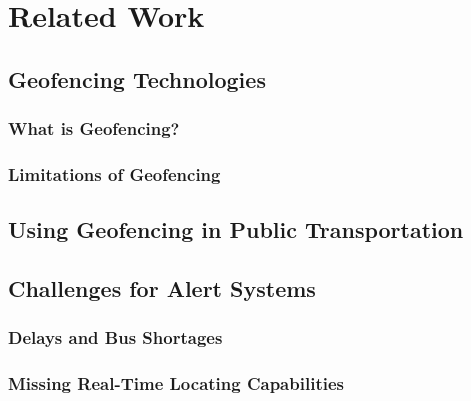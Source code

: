 \chapter{Related Work}
\label{cha:RelatedWork}

\section{Geofencing Technologies}
\subsection{What is Geofencing?}
\subsection{Limitations of Geofencing}

\section{Using Geofencing in Public Transportation}

\section{Challenges for Alert Systems}
\subsection{Delays and Bus Shortages}
\subsection{Missing Real-Time Locating Capabilities}

